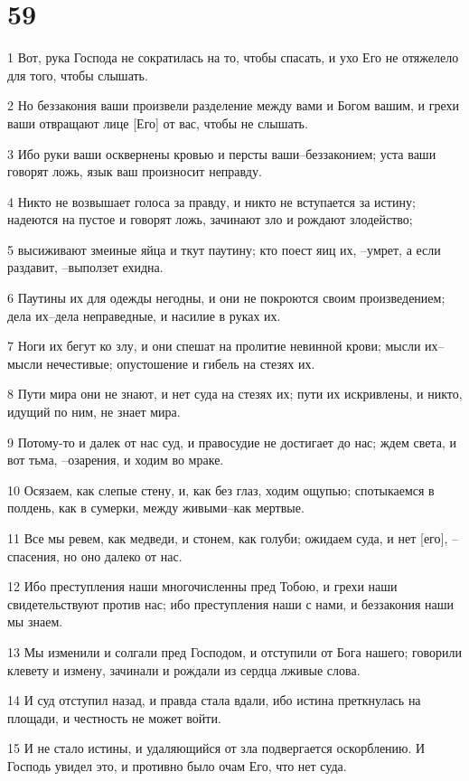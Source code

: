 \chapter{59}

\par 1 Вот, рука Господа не сократилась на то, чтобы спасать, и ухо Его не отяжелело для того, чтобы слышать.
\par 2 Но беззакония ваши произвели разделение между вами и Богом вашим, и грехи ваши отвращают лице [Его] от вас, чтобы не слышать.
\par 3 Ибо руки ваши осквернены кровью и персты ваши--беззаконием; уста ваши говорят ложь, язык ваш произносит неправду.
\par 4 Никто не возвышает голоса за правду, и никто не вступается за истину; надеются на пустое и говорят ложь, зачинают зло и рождают злодейство;
\par 5 высиживают змеиные яйца и ткут паутину; кто поест яиц их, --умрет, а если раздавит, --выползет ехидна.
\par 6 Паутины их для одежды негодны, и они не покроются своим произведением; дела их--дела неправедные, и насилие в руках их.
\par 7 Ноги их бегут ко злу, и они спешат на пролитие невинной крови; мысли их--мысли нечестивые; опустошение и гибель на стезях их.
\par 8 Пути мира они не знают, и нет суда на стезях их; пути их искривлены, и никто, идущий по ним, не знает мира.
\par 9 Потому-то и далек от нас суд, и правосудие не достигает до нас; ждем света, и вот тьма, --озарения, и ходим во мраке.
\par 10 Осязаем, как слепые стену, и, как без глаз, ходим ощупью; спотыкаемся в полдень, как в сумерки, между живыми--как мертвые.
\par 11 Все мы ревем, как медведи, и стонем, как голуби; ожидаем суда, и нет [его], --спасения, но оно далеко от нас.
\par 12 Ибо преступления наши многочисленны пред Тобою, и грехи наши свидетельствуют против нас; ибо преступления наши с нами, и беззакония наши мы знаем.
\par 13 Мы изменили и солгали пред Господом, и отступили от Бога нашего; говорили клевету и измену, зачинали и рождали из сердца лживые слова.
\par 14 И суд отступил назад, и правда стала вдали, ибо истина преткнулась на площади, и честность не может войти.
\par 15 И не стало истины, и удаляющийся от зла подвергается оскорблению. И Господь увидел это, и противно было очам Его, что нет суда.
